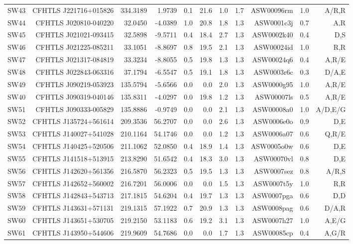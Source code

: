 \documentclass[useAMS,usenatbib,a4paper]{mn2e}
\begin{document}
\begin{center}
\begin{longtable}{lrrrrrrrrrr}
SW43 & CFHTLS J221716+015826 &  334.3189 &    1.9739 &  0.1 & 21.6 &  1.0 &  1.7 & ASW00096rm &  1.0  &  A/R,R   \\ 
SW44 & CFHTLS J020810-040220 &   32.0450 &   -4.0389 &  1.0 & 20.8 &  1.8 &  1.3 & ASW0001c3j &  0.7  &  A,R   \\ 
SW45 & CFHTLS J021021-093415 &   32.5898 &   -9.5711 &  0.4 & 18.4 &  2.7 &  1.3 & ASW0002k40 &  0.4  &  D,S   \\ 
SW46 & CFHTLS J021225-085211 &   33.1051 &   -8.8697 &  0.8 & 19.5 &  2.1 &  1.3 & ASW00024id &  1.0  &  R,R   \\ 
SW47 & CFHTLS J021317-084819 &   33.3234 &   -8.8055 &  0.5 & 19.8 &  1.3 &  1.3 & ASW00024q6 &  0.4  &  A,R/E   \\ 
SW48 & CFHTLS J022843-063316 &   37.1794 &   -6.5547 &  0.5 & 19.1 &  1.8 &  1.3 & ASW0003r6c &  0.3  &  D/A,E   \\ 
SW49 & CFHTLS J090219-053923 &  135.5794 &   -5.6566 &  0.0 &  0.0 &  2.0 &  1.3 & ASW0000g95 &  1.0  &  A,R/E   \\ 
SW40 & CFHTLS J090319-040146 &  135.8311 &   -4.0297 &  0.0 & 19.8 &  1.2 &  1.3 & ASW00007ls &  0.5  &  A,R/E   \\ 
SW51 & CFHTLS J090333-005829 &  135.8886 &   -0.9749 &  0.0 &  0.0 &  2.1 &  1.3 & ASW00008a0 &  1.0  &  A/D,E/G   \\ 
SW52 & CFHTLS J135724+561614 &  209.3536 &   56.2707 &  0.0 &  0.0 &  2.6 &  1.3 & ASW0006e0o &  0.9  &  D,E   \\ 
SW53 & CFHTLS J140027+541028 &  210.1164 &   54.1746 &  0.0 &  0.0 &  1.2 &  1.3 & ASW0006a07 &  0.6  &  Q,R/E   \\ 
SW54 & CFHTLS J140425+520506 &  211.1062 &   52.0850 &  0.4 & 18.9 &  1.4 &  1.3 & ASW0005o0w &  0.6  &  D,E   \\ 
SW55 & CFHTLS J141518+513915 &  213.8290 &   51.6542 &  0.4 & 18.3 &  3.0 &  1.3 & ASW00070vl &  0.8  &  D,E   \\ 
SW56 & CFHTLS J142620+561356 &  216.5870 &   56.2323 &  0.5 & 19.5 &  1.3 &  1.3 & ASW0007sez &  0.8  &  A/R,S   \\ 
SW57 & CFHTLS J142652+560002 &  216.7201 &   56.0006 &  0.0 &  0.0 &  1.5 &  1.3 & ASW0007t5y &  1.0  &  R,R   \\ 
SW58 & CFHTLS J142843+543713 &  217.1815 &   54.6204 &  0.4 & 19.7 &  1.3 &  1.3 & ASW0007pga &  0.6  &  D,D   \\ 
SW59 & CFHTLS J143631+571131 &  219.1315 &   57.1922 &  0.7 & 20.9 &  1.3 &  1.3 & ASW0008pag &  0.6  &  D/A,R   \\ 
SW60 & CFHTLS J143651+530705 &  219.2150 &   53.1183 &  0.6 & 19.2 &  3.1 &  1.3 & ASW0007h27 &  1.0  &  A,E/G   \\ 
SW61 & CFHTLS J143950+544606 &  219.9609 &   54.7686 &  0.0 &  0.0 &  1.7 &  1.3 & ASW00085cp &  0.4  &  A,G/R   \\ 
\end{longtable}
\end{center}
\end{document}
